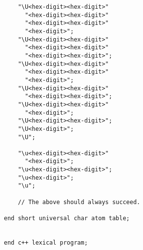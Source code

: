 \documentclass[12pt]{article}
\newenvironment{indpar}[1][0.3in]%
	{\begin{list}{}%
		     {\setlength{\itemsep}{0in}%
		      \setlength{\topsep}{0in}%
		      \setlength{\parsep}{1ex}%
		      \setlength{\labelwidth}{#1}%
		      \setlength{\leftmargin}{#1}%
		      \addtolength{\leftmargin}{\labelsep}}%
	 \item}%
	{\end{list}}
\begin{document}
\begin{indpar}
\begin{verbatim}
    "\U<hex-digit><hex-digit>"
      "<hex-digit><hex-digit>"
      "<hex-digit><hex-digit>"
      "<hex-digit>";
    "\U<hex-digit><hex-digit>"
      "<hex-digit><hex-digit>"
      "<hex-digit><hex-digit>";
    "\U<hex-digit><hex-digit>"
      "<hex-digit><hex-digit>"
      "<hex-digit>";
    "\U<hex-digit><hex-digit>"
      "<hex-digit><hex-digit>";
    "\U<hex-digit><hex-digit>"
      "<hex-digit>";
    "\U<hex-digit><hex-digit>";
    "\U<hex-digit>";
    "\U";

    "\u<hex-digit><hex-digit>"
      "<hex-digit>";
    "\u<hex-digit><hex-digit>";
    "\u<hex-digit>";
    "\u";

    // The above should always succeed.

end short universal char atom table;


end c++ lexical program;

\end{verbatim}\end{indpar}





\printindex
\end{document}
